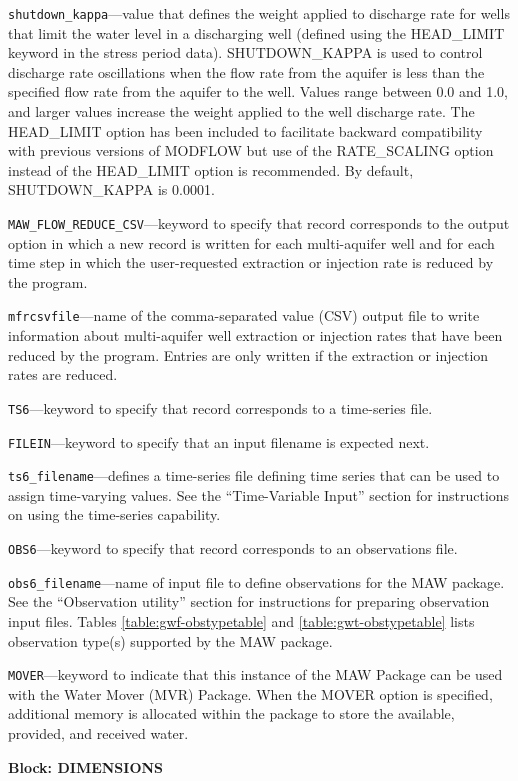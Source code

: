 \begin{description}
\item \texttt{shutdown\_kappa}---value that defines the weight applied to discharge rate for wells that limit the water level in a discharging well (defined using the HEAD\_LIMIT keyword in the stress period data). SHUTDOWN\_KAPPA is used to control discharge rate oscillations when the flow rate from the aquifer is less than the specified flow rate from the aquifer to the well. Values range between 0.0 and 1.0, and larger values increase the weight applied to the well discharge rate. The HEAD\_LIMIT option has been included to facilitate backward compatibility with previous versions of MODFLOW but use of the RATE\_SCALING option instead of the HEAD\_LIMIT option is recommended. By default, SHUTDOWN\_KAPPA is 0.0001.

\item \texttt{MAW\_FLOW\_REDUCE\_CSV}---keyword to specify that record corresponds to the output option in which a new record is written for each multi-aquifer well and for each time step in which the user-requested extraction or injection rate is reduced by the program.

\item \texttt{mfrcsvfile}---name of the comma-separated value (CSV) output file to write information about multi-aquifer well extraction or injection rates that have been reduced by the program. Entries are only written if the extraction or injection rates are reduced.

\item \texttt{TS6}---keyword to specify that record corresponds to a time-series file.

\item \texttt{FILEIN}---keyword to specify that an input filename is expected next.

\item \texttt{ts6\_filename}---defines a time-series file defining time series that can be used to assign time-varying values. See the ``Time-Variable Input'' section for instructions on using the time-series capability.

\item \texttt{OBS6}---keyword to specify that record corresponds to an observations file.

\item \texttt{obs6\_filename}---name of input file to define observations for the MAW package. See the ``Observation utility'' section for instructions for preparing observation input files. Tables \ref{table:gwf-obstypetable} and \ref{table:gwt-obstypetable} lists observation type(s) supported by the MAW package.

\item \texttt{MOVER}---keyword to indicate that this instance of the MAW Package can be used with the Water Mover (MVR) Package.  When the MOVER option is specified, additional memory is allocated within the package to store the available, provided, and received water.

\end{description}
\item \textbf{Block: DIMENSIONS}

